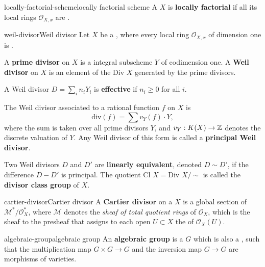\begin{topic}{locally-factorial-scheme}{locally factorial scheme}
    A  $X$ is \textbf{locally factorial} if all its local rings $\mathcal{O}_{X,x}$ are .
\end{topic}

\begin{topic}{weil-divisor}{Weil divisor}
    Let $X$ be a    , where every local ring $\mathcal{O}_{X,x}$ of dimension one is .
    
    A \textbf{prime divisor} on $X$ is a  integral subscheme $Y$ of codimension one. A \textbf{Weil divisor} on $X$ is an element of the  $\text{Div } X$ generated by the prime divisors.
    
    A Weil divisor $D = \sum_i n_i Y_i$ is \textbf{effective} if $n_i \ge 0$ for all $i$.
    
    The Weil divisor associated to a rational function $f$ on $X$ is
    \[ \text{div}(f) = \sum v_Y(f) \cdot Y , \]
    where the sum is taken over all prime divisors $Y$, and $v_Y : K(X) \to \mathbb{Z}$ denotes the discrete valuation of $Y$. Any Weil divisor of this form is called a \textbf{principal Weil divisor}.
    
    Two Weil divisors $D$ and $D'$ are \textbf{linearly equivalent}, denoted $D \sim{} D'$, if the difference $D - D'$ is principal. The quotient $\text{Cl } X = \text{Div } X / \sim{}$ is called the \textbf{divisor class group} of $X$.
\end{topic}

\begin{topic}{cartier-divisor}{Cartier divisor}
    A \textbf{Cartier divisor} on a  $X$ is a global section of $\mathcal{M}^*/\mathcal{O}_X^*$, where $\mathcal{M}$ denotes the \textit{sheaf of total quotient rings} of $\mathcal{O}_X$, which is the sheaf  to the presheaf that assigns to each open $U \subset X$ the  of $\mathcal{O}_X(U)$.
\end{topic}

\begin{topic}{algebraic-group}{algebraic group}
    An \textbf{algebraic group} is a  $G$ which is also a , such that the multiplication map $G \times G \to G$ and the inversion map $G \to G$ are morphisms of varieties.
\end{topic}

